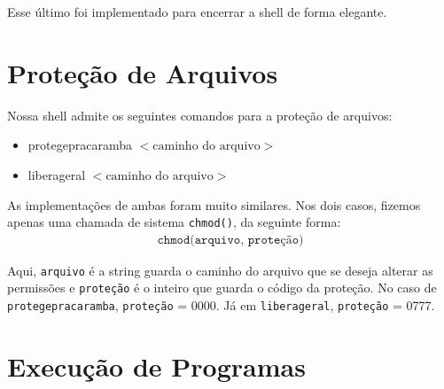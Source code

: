 \documentclass[a4paper, 12pt]{article}
\begin{document}
Esse último foi implementado para encerrar a shell de forma elegante.

\section{Proteção de Arquivos}

Nossa shell admite os seguintes comandos para a proteção de arquivos:
\begin{itemize}
\item protegepracaramba $<\textrm{caminho do arquivo}>$
\item liberageral $<\textrm{caminho do arquivo}>$
\end{itemize}

As implementações de ambas foram muito similares.  Nos dois casos,  fizemos apenas uma chamada de sistema \texttt{chmod()}, da seguinte forma:
\begin{align*}
\texttt{chmod(arquivo, proteção)}
\end{align*}


Aqui, \texttt{arquivo} é a string guarda o caminho do arquivo que se deseja alterar as permissões e \texttt{proteção} é o inteiro que guarda o código da proteção.  No caso de \texttt{protegepracaramba}, \texttt{proteção} = 0000. Já em \texttt{liberageral}, \texttt{proteção} = 0777.

\section{Execução de Programas}
\end{document}

